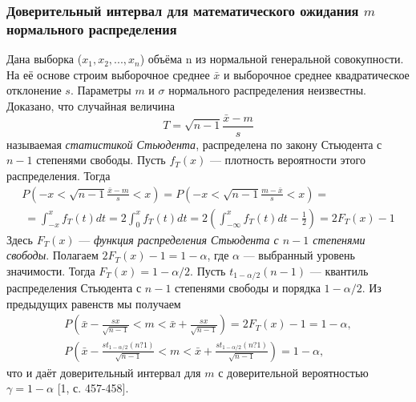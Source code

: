\subsubsection{Доверительный интервал для математического ожидания $m$ нормального распределения}
Дана выборка ($x_{1},x_{2}, ... ,x_{n}$) объёма n из нормальной генеральной совокупности. На её основе строим выборочное среднее $\bar{x}$ и выборочное среднее квадратическое отклонение $s$. Параметры $m$ и $\sigma$ нормального распределения неизвестны.
\newline
Доказано, что случайная величина
\begin{equation}
	T = \sqrt{n - 1}\frac{\bar{x} - m}{s}
	\label{T}
\end{equation}
называемая \textit{статистикой Стьюдента}, распределена по закону Стьюдента с $n-1$ степенями свободы. Пусть $f_{T}(x)$ — плотность вероятности этого распределения. Тогда 
\begin{multline}
	P\left(-x < \sqrt{n - 1}\frac{\bar{x} - m}{s} < x \right) = 
	P\left(-x < \sqrt{n - 1}\frac{m - \bar{x}}{s} < x \right) = \\\
	= \int_{-x}^{x}{f_{T}(t)d t} = 2 \int_{0}^{x}{f_{T}(t)d t} = 
	2\left(  \int_{-\infty}^{x}{f_{T}(t)d t} - \frac{1}{2} \right) = 2F_{T}(x) - 1
	\label{P_f_t}
\end{multline}
Здесь $F_{T}(x)$ — \textit{функция распределения Стьюдента с $n-1$ степенями свободы}.
\newline
Полагаем $2F_{T}(x)-1 = 1-\alpha$, где $\alpha$ — выбранный уровень значимости. Тогда $F_{T}(x) = 1-\alpha/2$. Пусть $t_{1-\alpha/2}(n-1)$ — квантиль распределения Стьюдента с $n-1$ степенями свободы и порядка $1-\alpha/2$. Из предыдущих равенств мы получаем 
\begin{equation}
	\begin{split}
		P\left(\bar{x} - \frac{sx}{\sqrt{n-1}} < m <  \bar{x} + \frac{sx}{\sqrt{n-1}}\right) = 2F_{T}(x) - 1 = 1 - \alpha,  \\
		P\left(\bar{x} - \frac{st_{1-\alpha/2}(n?1)}{\sqrt{n-1}} < m <  \bar{x} + \frac{st_{1-\alpha/2}(n?1)}{\sqrt{n-1}}\right)= 1 - \alpha, 
		\label{P_m}     
	\end{split}
\end{equation}
что и даёт доверительный интервал для $m$ с доверительной вероятностью $\gamma = 1-\alpha$ [1, с. 457-458].

